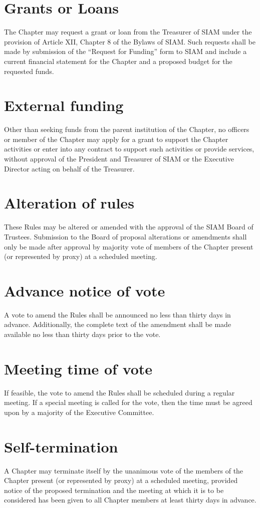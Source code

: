 \documentclass{ronr-bylaws}
\begin{document}
\section{Grants or Loans}
The Chapter may request a grant or loan from the Treasurer of SIAM under the provision of Article
XII, Chapter 8 of the Bylaws of SIAM. Such requests shall be made by submission of the ``Request for
Funding'' form to SIAM and include a current financial statement for the Chapter and a proposed
budget for the requested funds.

\section{External funding}
Other than seeking funds from the parent institution of the Chapter, no officers
or member of the Chapter may apply for a grant to support the Chapter activities or enter into
any contract to support such activities or provide services, without approval of the President and
Treasurer of SIAM or the Executive Director acting on behalf of the Treasurer.

\section{Alteration of rules}
These Rules may be altered or amended with the approval of the SIAM Board of Trustees. Submission to
the Board of proposal alterations or amendments shall only be made after approval by majority vote
of members of the Chapter present (or represented by proxy) at a scheduled meeting.

\section{Advance notice of vote}
A vote to amend the Rules shall be announced no less than thirty days in advance. Additionally, the
complete text of the amendment shall be made available no less than thirty days prior to the vote.

\section{Meeting time of vote}
If feasible, the vote to amend the Rules shall be scheduled during a regular meeting. If a special
meeting is called for the vote, then the time must be agreed upon by a majority of the Executive
Committee.

\section{Self-termination}
A Chapter may terminate itself by the unanimous vote of the members of the Chapter present (or
represented by proxy) at a scheduled meeting, provided notice of the proposed termination and the
meeting at which it is to be considered has been given to all Chapter members at least thirty days
in advance.
\end{document}
